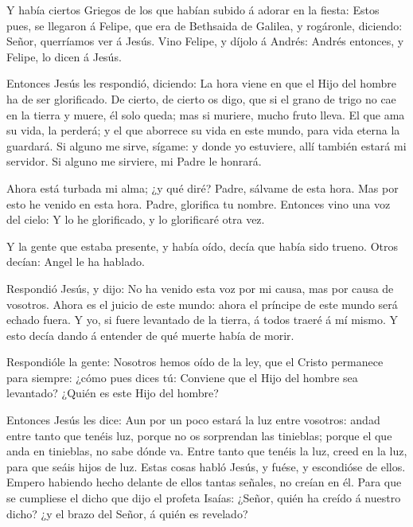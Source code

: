  Y había ciertos Griegos de los que habían subido á adorar
en la fiesta:  Estos pues, se llegaron á Felipe, que era de
Bethsaida de Galilea, y rogáronle, diciendo: Señor, querríamos ver á
Jesús.  Vino Felipe, y díjolo á Andrés: Andrés entonces, y
Felipe, lo dicen á Jesús.

 Entonces Jesús les respondió, diciendo: La hora viene en
que el Hijo del hombre ha de ser glorificado.  De cierto,
de cierto os digo, que si el grano de trigo no cae en la tierra y muere,
él solo queda; mas si muriere, mucho fruto lleva.  El que
ama su vida, la perderá; y el que aborrece su vida en este mundo, para
vida eterna la guardará.  Si alguno me sirve, sígame: y
donde yo estuviere, allí también estará mi servidor. Si alguno me
sirviere, mi Padre le honrará.

 Ahora está turbada mi alma; ¿y qué diré? Padre, sálvame de
esta hora. Mas por esto he venido en esta hora.  Padre,
glorifica tu nombre. Entonces vino una voz del cielo: Y lo he
glorificado, y lo glorificaré otra vez.

 Y la gente que estaba presente, y había oído, decía que
había sido trueno. Otros decían: Angel le ha hablado.

 Respondió Jesús, y dijo: No ha venido esta voz por mi
causa, mas por causa de vosotros.  Ahora es el juicio de
este mundo: ahora el príncipe de este mundo será echado fuera.
 Y yo, si fuere levantado de la tierra, á todos traeré á mí
mismo.  Y esto decía dando á entender de qué muerte había
de morir.

 Respondióle la gente: Nosotros hemos oído de la ley, que
el Cristo permanece para siempre: ¿cómo pues dices tú: Conviene que el
Hijo del hombre sea levantado? ¿Quién es este Hijo del hombre?

 Entonces Jesús les dice: Aun por un poco estará la luz
entre vosotros: andad entre tanto que tenéis luz, porque no os
sorprendan las tinieblas; porque el que anda en tinieblas, no sabe dónde
va.  Entre tanto que tenéis la luz, creed en la luz, para
que seáis hijos de luz. Estas cosas habló Jesús, y fuése, y escondióse
de ellos.  Empero habiendo hecho delante de ellos tantas
señales, no creían en él.  Para que se cumpliese el dicho
que dijo el profeta Isaías: ¿Señor, quién ha creído á nuestro dicho? ¿y
el brazo del Señor, á quién es revelado?

